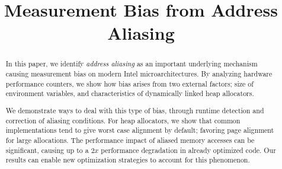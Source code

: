 \documentclass[10pt, conference, compsocconf]{IEEEtran}
\begin{document}
\title{Measurement Bias from Address Aliasing}

\author{
\and
{}
}

\maketitle

\begin{abstract} %
In this paper, we identify \emph{address aliasing} as an important underlying mechanism causing measurement bias on modern Intel microarchitectures.
By analyzing hardware performance counters, we show how bias arises from two external factors; size of environment variables, and characteristics of dynamically linked heap allocators.

We demonstrate ways to deal with this type of bias, through runtime detection and correction of aliasing conditions.
For heap allocators, we show that common implementations tend to give worst case alignment by default; favoring page alignment for large allocations.
The performance impact of aliased memory accesses can be significant, causing up to a $2x$ performance degradation in already optimized code.
Our results can enable new optimization strategies to account for this phenomenon.
\end{abstract}
\end{document}

